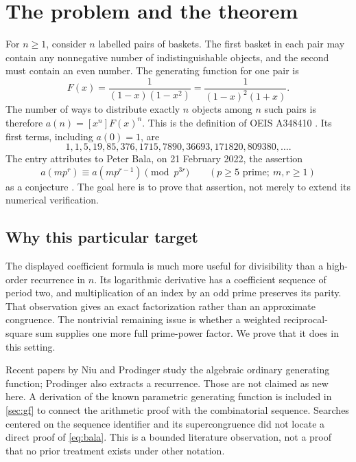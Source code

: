\documentclass[11pt,a4paper]{article}
\numberwithin{equation}{section}
\theoremstyle{definition}
\theoremstyle{remark}
\begin{document}
\section{The problem and the theorem}\label{sec:problem}

For $n\geq1$, consider $n$ labelled pairs of baskets. The first basket in
each pair may contain any nonnegative number of indistinguishable
objects, and the second must contain an even number. The generating
function for one pair is
\begin{equation}\label{eq:F-original}
 F(x)=\frac{1}{(1-x)(1-x^2)}
     =\frac{1}{(1-x)^2(1+x)}.
\end{equation}
The number of ways to distribute exactly $n$ objects among $n$ such pairs
is therefore $a(n)=[x^n]F(x)^n$. This is the definition of OEIS A348410
\cite{oeis}. Its first terms, including $a(0)=1$, are
\[
1,1,5,19,85,376,1715,7890,36693,171820,809380,\ldots.
\]
The entry attributes to Peter Bala, on 21 February 2022, the assertion
\begin{equation}\label{eq:bala}
 a(mp^r)\equiv a(mp^{r-1})\pmod{p^{3r}}
 \qquad(p\geq5\text{ prime};\ m,r\geq1)
\end{equation}
as a conjecture \cite{oeis}. The goal here is to prove that assertion,
not merely to extend its numerical verification.

\subsection{Why this particular target}

The displayed coefficient formula is much more useful for divisibility
than a high-order recurrence in $n$. Its logarithmic derivative has a
coefficient sequence of period two, and multiplication of an index by an
odd prime preserves its parity. That observation gives an exact
factorization rather than an approximate congruence. The nontrivial
remaining issue is whether a weighted reciprocal-square sum supplies
one more full prime-power factor. We prove that it does in this setting.

Recent papers by Niu \cite{niu} and Prodinger \cite{prodinger} study the
algebraic ordinary generating function; Prodinger also extracts a
recurrence. Those are not claimed as new here. A derivation of the known
parametric generating function is included in \cref{sec:gf} to connect
the arithmetic proof with the combinatorial sequence. Searches centered
on the sequence identifier and its supercongruence did not locate a
direct proof of \eqref{eq:bala}. This is a bounded literature observation,
not a proof that no prior treatment exists under other notation.
\end{document}
